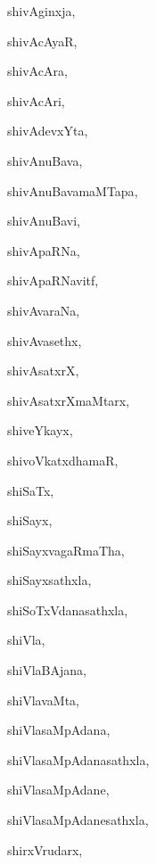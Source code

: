 \begin{multicols}{3}
{\noindent
{shivAginxja}, \pageref{shivAginxja}

\noindent
{shivAcAyaR}, \pageref{shivAcAyaR}

\noindent
{shivAcAra}, \pageref{shivAcAra}

\noindent
{shivAcAri}, \pageref{shivAcAri}

\noindent
{shivAdevxYta}, \pageref{shivAdevxYta}

\noindent
{shivAnuBava}, \pageref{shivAnuBava}

\noindent
{shivAnuBavamaMTapa}, \pageref{shivAnuBavamaMTapa}

\noindent
{shivAnuBavi}, \pageref{shivAnuBavi}

\noindent
{shivApaRNa}, \pageref{shivApaRNa}

\noindent
{shivApaRNavitf}, \pageref{shivApaRNavitf}

\noindent
{shivAvaraNa}, \pageref{shivAvaraNa}

\noindent
{shivAvasethx}, \pageref{shivAvasethx}

\noindent
{shivAsatxrX}, \pageref{shivAsatxrX}

\noindent
{shivAsatxrXmaMtarx}, \pageref{shivAsatxrXmaMtarx}

\noindent
{shiveYkayx}, \pageref{shiveYkayx}

\noindent
{shivoVkatxdhamaR}, \pageref{shivoVkatxdhamaR}

\noindent
{shiSaTx}, \pageref{shiSaTx}

\noindent
{shiSayx}, \pageref{shiSayx}

\noindent
{shiSayxvagaRmaTha}, \pageref{shiSayxvagaRmaTha}

\noindent
{shiSayxsathxla}, \pageref{shiSayxsathxla}

\noindent
{shiSoTxVdanasathxla}, \pageref{shiSoTxVdanasathxla}

\noindent
{shiVla}, \pageref{shiVla}

\noindent
{shiVlaBAjana}, \pageref{shiVlaBAjana}

\noindent
{shiVlavaMta}, \pageref{shiVlavaMta}

\noindent
{shiVlasaMpAdana}, \pageref{shiVlasaMpAdana}

\noindent
{shiVlasaMpAdanasathxla}, \pageref{shiVlasaMpAdanasathxla}

\noindent
{shiVlasaMpAdane}, \pageref{shiVlasaMpAdane}

\noindent
{shiVlasaMpAdanesathxla}, \pageref{shiVlasaMpAdanesathxla}

\noindent
{shirxVrudarx}, \pageref{shirxVrudarx}

}
\end{multicols}
